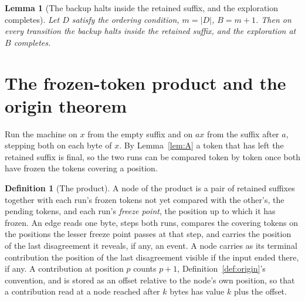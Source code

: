 \documentclass[11pt,a4paper]{article}
\theoremstyle{definition}
\newtheorem{definition}{Definition}
\theoremstyle{plain}
\newtheorem{lemma}{Lemma}
\begin{document}

\begin{lemma}[The backup halts inside the retained suffix, and the exploration completes]\label{lem:B}
Let \(D\) satisfy the ordering condition, \(m = |D|\), \(B = m + 1\). Then on every transition the backup halts inside
the retained suffix, and the exploration at \(B\) completes.
\end{lemma}

\section{The frozen-token product and the origin theorem}\label{sec:product}

Run the machine on \(x\) from the empty suffix and on \(ax\) from the suffix after \(a\), stepping both on each byte of
\(x\). By Lemma~\ref{lem:A} a token that has left the retained suffix is final, so the two runs can be compared token by
token once both have frozen the tokens covering a position.


\begin{definition}[The product]\label{def:product}
A node of the product is a pair of retained suffixes together with each run's frozen tokens not yet compared with the
other's, the pending tokens, and each run's \emph{freeze point}, the position up to which it has frozen. An edge reads
one byte, steps both runs, compares the covering tokens on the positions the lesser freeze point passes at that step,
and carries the position of the last disagreement it reveals, if any, an event. A node carries as its terminal
contribution the position of the last disagreement visible if the input ended there, if any. A contribution at position
\(p\) counts \(p + 1\), Definition~\ref{def:origin}'s convention, and is stored as an offset relative to the node's own
position, so that a contribution read at a node reached after \(k\) bytes has value \(k\) plus the offset.
\end{definition}
\end{document}
